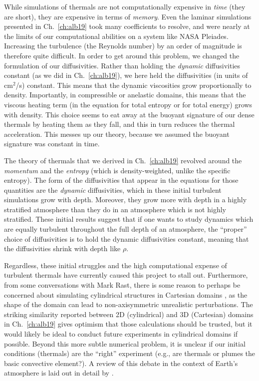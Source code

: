 While simulations of thermals are not computationally expensive in \emph{time} (they are short), they are expensive in terms of \emph{memory}.
Even the laminar simulations presented in Ch.~\ref{ch:alb19} took many coefficients to resolve, and were nearly at the limits of our computational abilities on a system like NASA Pleiades.
Increasing the turbulence (the Reynolds number) by an order of magnitude is therefore quite difficult.
In order to get around this problem, we changed the formulation of our diffusivities.
Rather than holding the \emph{dynamic} diffusivities constant (as we did in Ch.~\ref{ch:alb19}), we here held the diffusivities (in units of cm$^2$/s) constant.
This means that the dynamic viscosities grow proportionally to density.
Importantly, in compressible or anelastic domains, this means that the viscous heating term (in the equation for total entropy or for total energy) grows with density.
This choice seems to eat away at the buoyant signature of our dense thermals by heating them as they fall, and this in turn reduces the thermal acceleration.
This messes up our theory, because we assumed the buoyant signature was constant in time.

The theory of thermals that we derived in Ch.~\ref{ch:alb19} revolved around the \emph{momentum} and the \emph{entropy} (which is density-weighted, unlike the specific entropy).
The form of the diffusivities that appear in the equations for those quantities are the \emph{dynamic} diffusivities, which in these initial turbulent simulations grow with depth.
Moreover, they grow more with depth in a highly stratified atmosphere than they do in an atmosphere which is not highly stratified.
These initial results suggest that if one wants to study dynamics which are equally turbulent throughout the full depth of an atmosphere, the ``proper'' choice of diffusivities is to hold the dynamic diffusivities constant, meaning that the diffusivities shrink with depth like $\rho$.

Regardless, these initial struggles and the high computational expense of turbulent thermals have currently caused this project to stall out.
Furthermore, from some conversations with Mark Rast, there is some reason to perhaps be concerned about simulating cylindrical structures in Cartesian domains \citep[see e.g., Fig.~9 of][]{clyne&all2007}, as the shape of the domain can lead to non-axisymmetric unrealistic perturbations.
The striking similarity reported between 2D (cylindrical) and 3D (Cartesian) domains in Ch.~\ref{ch:alb19} gives optimism that those calculations should be trusted, but it would likely be ideal to conduct future experiments in cylindrical domains if possible.
Beyond this more subtle numerical problem, it is unclear if our initial conditions (thermals) are the ``right'' experiment (e.g., are thermals or plumes the basic convective element?).
A review of this debate in the context of Earth's atmosphere is laid out in detail by \citet{yano2014}.



